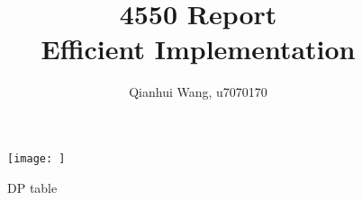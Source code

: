 \documentclass[12pt]{article}
\begin{document}
\title{4550 Report \\ \large{Efficient Implementation}}
\author{Qianhui Wang, u7070170}
\maketitle
\pagebreak

\begin{figure}[H]
  \centering
  \texttt{[image: ]}
  \caption{DP table}
\end{figure}
\end{document}
